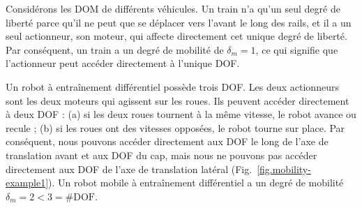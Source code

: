 {Considérons les DOM de différents véhicules. Un train n'a qu'un seul degré de liberté parce qu'il ne peut que se déplacer vers l'avant le long des rails, et il a un seul actionneur, son moteur, qui affecte directement cet unique degré de liberté. Par conséquent, un train a un degré de mobilité de $\delta_m = 1$, ce qui signifie que l'actionneur peut accéder directement à l'unique DOF.

Un robot à entraînement différentiel possède trois DOF. Les deux actionneurs sont les deux moteurs qui agissent sur les roues. Ils peuvent accéder directement à deux DOF : (a) si les deux roues tournent à la même vitesse, le robot avance ou recule ; (b) si les roues ont des vitesses opposées, le robot tourne sur place. Par conséquent, nous pouvons accéder directement aux DOF le long de l'axe de translation avant et aux DOF du cap, mais nous ne pouvons pas accéder directement aux DOF de l'axe de translation latéral (Fig.~\ref{fig.mobility-example1}). Un robot mobile à entraînement différentiel a un degré de mobilité $\delta_m = 2 < 3 = \#\textrm{DOF}$.

}
